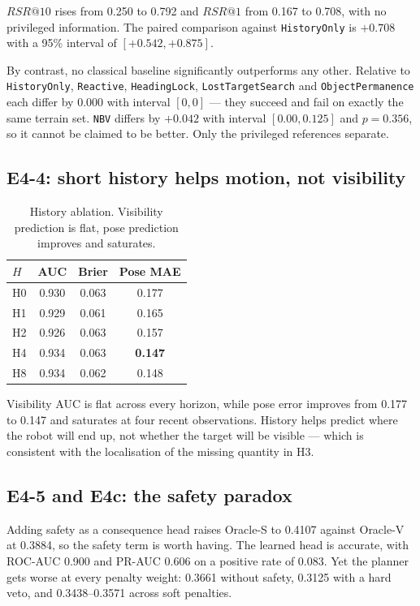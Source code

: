 \documentclass[utf8]{FrontiersinHarvard}
\begin{document}
$RSR@10$ rises from 0.250 to 0.792 and $RSR@1$ from 0.167 to 0.708, with no privileged
information. The paired comparison against \texttt{HistoryOnly} is $+0.708$ with a 95\%
interval of $[+0.542, +0.875]$.

By contrast, no classical baseline significantly outperforms any other. Relative to
\texttt{HistoryOnly}, \texttt{Reactive}, \texttt{HeadingLock}, \texttt{LostTargetSearch}
and \texttt{ObjectPermanence} each differ by $0.000$ with interval $[0,0]$ --- they
succeed and fail on exactly the same terrain set. \texttt{NBV} differs by $+0.042$ with
interval $[0.00, 0.125]$ and $p=0.356$, so it cannot be claimed to be better. Only the
privileged references separate.

\subsection{E4-4: short history helps motion, not visibility}

\begin{table}[h]
\caption{History ablation. Visibility prediction is flat, pose prediction improves and
saturates.}
\label{tab:history}
\begin{tabular}{lccc}
\toprule
$H$ & AUC & Brier & Pose MAE \\
\midrule
H0 & 0.930 & 0.063 & 0.177 \\
H1 & 0.929 & 0.061 & 0.165 \\
H2 & 0.926 & 0.063 & 0.157 \\
H4 & 0.934 & 0.063 & \textbf{0.147} \\
H8 & 0.934 & 0.062 & 0.148 \\
\bottomrule
\end{tabular}
\end{table}

Visibility AUC is flat across every horizon, while pose error improves from 0.177 to
0.147 and saturates at four recent observations. History helps predict where the robot
will end up, not whether the target will be visible --- which is consistent with the
localisation of the missing quantity in H3.

\subsection{E4-5 and E4c: the safety paradox}

Adding safety as a consequence head raises Oracle-S to 0.4107 against Oracle-V at
0.3884, so the safety term is worth having. The learned head is accurate, with ROC-AUC
0.900 and PR-AUC 0.606 on a positive rate of 0.083. Yet the planner gets worse at every
penalty weight: 0.3661 without safety, 0.3125 with a hard veto, and 0.3438--0.3571
across soft penalties.
\end{document}
